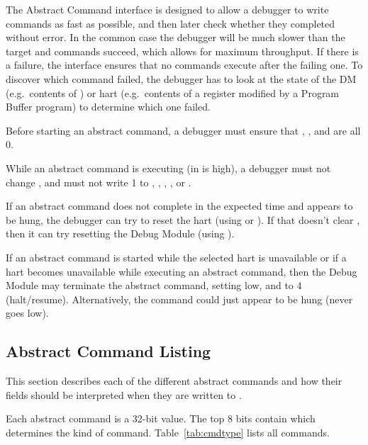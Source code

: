 \begin{commentary}
    The Abstract Command interface is designed to allow a debugger to write
    commands as fast as possible, and then later check whether they completed
    without error.  In the common case the debugger will be much slower than
    the target and commands succeed, which allows for maximum throughput. If
    there is a failure, the interface ensures that no commands execute after
    the failing one.  To discover which command failed, the debugger has to
    look at the state of the DM (e.g.\ contents of \RdmDataZero) or hart (e.g.\ 
    contents of a register modified by a Program Buffer program) to determine
    which one failed.
\end{commentary}

Before starting an abstract command, a debugger must ensure that \FdmDmcontrolHaltreq,
\FdmDmcontrolResumereq, and \FdmDmcontrolAckhavereset are all 0.

While an abstract command is executing (\FdmAbstractcsBusy in \RdmAbstractcs is high), a
debugger must not change \Fhartsel, and must not write 1 to \FdmDmcontrolHaltreq,
\FdmDmcontrolResumereq, \FdmDmcontrolAckhavereset, \FdmDmcontrolSetresethaltreq, or \FdmDmcontrolClrresethaltreq.

If an abstract command does not complete in the expected time and appears to be
hung, the debugger can try to reset the hart (using \FdmDmcontrolHartreset or
\FdmDmcontrolNdmreset). If that doesn't clear \FdmAbstractcsBusy, then it
can try resetting the Debug Module (using \FdmDmcontrolDmactive).

If an abstract command is started while the selected hart is unavailable or if
a hart becomes unavailable while executing an abstract command, then the
Debug Module may terminate the abstract command, setting \FdmAbstractcsBusy low, and
\FdmAbstractcsCmderr to 4 (halt/resume). Alternatively, the command could just appear to be
hung (\FdmAbstractcsBusy never goes low).

\subsection{Abstract Command Listing}

This section describes each of the different abstract commands
and how their fields should be interpreted when
they are written to \RdmCommand.

Each abstract command is a 32-bit value. The top 8 bits contain \FdmCommandCmdtype which
determines the kind of command. Table~\ref{tab:cmdtype} lists all commands.

